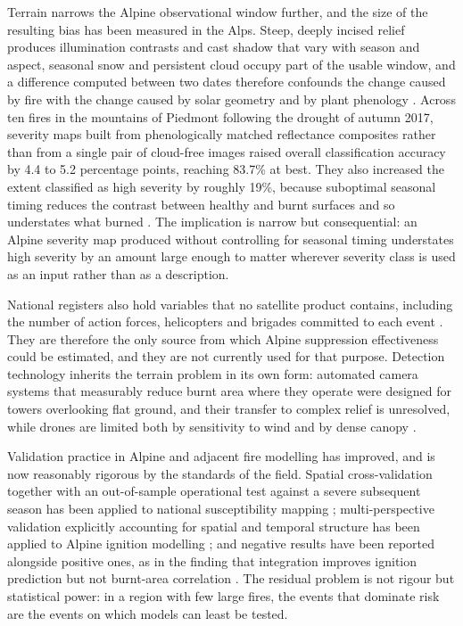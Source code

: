 \documentclass[11pt,a4paper]{article}
\begin{document}
Terrain narrows the Alpine observational window further, and the size of the resulting bias has been measured in the Alps. Steep, deeply incised relief produces illumination contrasts and cast shadow that vary with season and aspect, seasonal snow and persistent cloud occupy part of the usable window, and a difference computed between two dates therefore confounds the change caused by fire with the change caused by solar geometry and by plant phenology \citep{morresi_mapping_2022}. Across ten fires in the mountains of Piedmont following the drought of autumn 2017, severity maps built from phenologically matched reflectance composites rather than from a single pair of cloud-free images raised overall classification accuracy by 4.4 to 5.2 percentage points, reaching 83.7\% at best. They also increased the extent classified as high severity by roughly 19\%, because suboptimal seasonal timing reduces the contrast between healthy and burnt surfaces and so understates what burned \citep{morresi_mapping_2022}. The implication is narrow but consequential: an Alpine severity map produced without controlling for seasonal timing understates high severity by an amount large enough to matter wherever severity class is used as an input rather than as a description.

National registers also hold variables that no satellite product contains, including the number of action forces, helicopters and brigades committed to each event \citep{muller_forest_2020}. They are therefore the only source from which Alpine suppression effectiveness could be estimated, and they are not currently used for that purpose. Detection technology inherits the terrain problem in its own form: automated camera systems that measurably reduce burnt area where they operate were designed for towers overlooking flat ground, and their transfer to complex relief is unresolved, while drones are limited both by sensitivity to wind and by dense canopy \citep{muller_forest_2020}.

Validation practice in Alpine and adjacent fire modelling has improved, and is now reasonably rigorous by the standards of the field. Spatial cross-validation together with an out-of-sample operational test against a severe subsequent season has been applied to national susceptibility mapping \citep{trucchia_defining_2022}; multi-perspective validation explicitly accounting for spatial and temporal structure has been applied to Alpine ignition modelling \citep{moreno_1_nodate}; and negative results have been reported alongside positive ones, as in the finding that integration improves ignition prediction but not burnt-area correlation \citep{muller_towards_2020}. The residual problem is not rigour but statistical power: in a region with few large fires, the events that dominate risk are the events on which models can least be tested.
\end{document}
